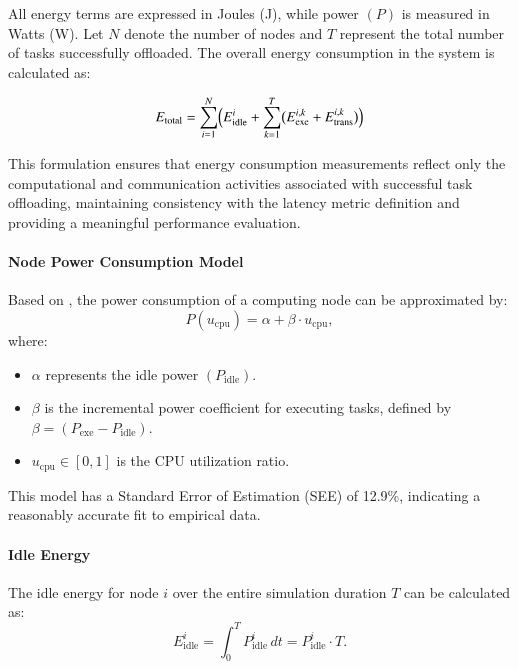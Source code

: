 \documentclass[preprint,12pt]{elsarticle}
\begin{document}
All energy terms are expressed in Joules (J), while power $(P)$ is measured in Watts (W). Let $N$ denote the number of nodes and $T$ represent the total number of tasks successfully offloaded. The overall energy consumption in the system is calculated as:

\begin{equation}
E_{\text{total}} = 
    \sum_{i=1}^{N}
    \Bigl( E_{\text{idle}}^{i} + \sum_{k=1}^{T} 
    \bigl(E_{\text{exe}}^{i,k} + E_{\text{trans}}^{i,k}\bigr) \Bigr)
\end{equation}

This formulation ensures that energy consumption measurements reflect only the computational and communication activities associated with successful task offloading, maintaining consistency with the latency metric definition and providing a meaningful performance evaluation.

\paragraph{Node Power Consumption Model}
Based on \cite{ismail_computing_2021}, the power consumption of a computing node can be approximated by:
\begin{equation}
P(u_{\text{cpu}}) = \alpha + \beta \cdot u_{\text{cpu}},
\end{equation}
where:
\begin{itemize}
    \item \(\alpha\) represents the idle power \((P_{\text{idle}})\).
    \item \(\beta\) is the incremental power coefficient for executing tasks, defined by \(\beta = (P_{\text{exe}} - P_{\text{idle}})\).
    \item \(u_{\text{cpu}} \in [0,1]\) is the CPU utilization ratio.
\end{itemize}

This model has a Standard Error of Estimation (SEE) of 12.9\%, indicating a reasonably accurate fit to empirical data. 

\paragraph{Idle Energy}
The idle energy for node \(i\) over the entire simulation duration \(T\) can be calculated as:
\begin{equation}
E_{\text{idle}}^{i} = \int_{0}^{T} P_{\text{idle}}^{i} \, dt = P_{\text{idle}}^{i} \cdot T.
\end{equation}
\end{document}
